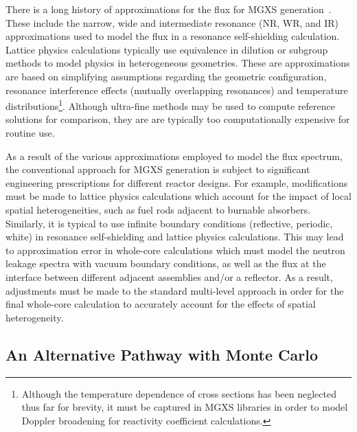 There is a long history of approximations for the flux for \ac{MGXS} generation~\cite{cacuci2010handbook}. These include the narrow, wide and intermediate resonance (NR, WR, and IR) approximations used to model the flux in a resonance self-shielding calculation. Lattice physics calculations typically use equivalence in dilution or subgroup methods to model physics in heterogeneous geometries. These are approximations are based on simplifying assumptions regarding the geometric configuration, resonance interference effects (mutually overlapping resonances) and temperature distributions\footnote{Although the temperature dependence of cross sections has been neglected thus far for brevity, it must be captured in \ac{MGXS} libraries in order to model Doppler broadening for reactivity coefficient calculations.}. Although ultra-fine methods may be used to compute reference solutions for comparison, they are are typically too computationally expensive for routine use. 

As a result of the various approximations employed to model the flux spectrum, the conventional approach for \ac{MGXS} generation is subject to significant engineering prescriptions for different reactor designs.  For example, modifications must be made to lattice physics calculations which account for the impact of local spatial heterogeneities, such as fuel rods adjacent to burnable absorbers. Similarly, it is typical to use infinite boundary conditions (reflective, periodic, white) in resonance self-shielding and lattice physics calculations. This may lead to approximation error in whole-core calculations which must model the neutron leakage spectra with vacuum boundary conditions, as well as the flux at the interface between different adjacent assemblies and/or a reflector. As a result, adjustments must be made to the standard multi-level approach in order for the final whole-core calculation to accurately account for the effects of spatial heterogeneity.


\subsection{An Alternative Pathway with Monte Carlo}
\label{subsec:chap2-mgxs-lib-mc}

